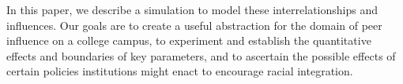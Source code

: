 In this paper, we describe a simulation to model these interrelationships and
influences. Our goals are to create a useful abstraction for the domain of
peer influence on a college campus, to experiment and establish the
quantitative effects and boundaries of key parameters, and to ascertain the
possible effects of certain policies institutions might enact to encourage
racial integration.
